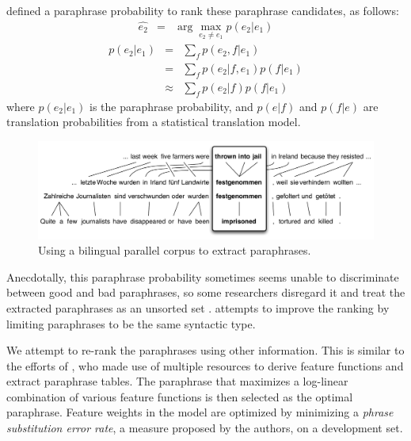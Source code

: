 \documentclass[11pt]{article}
\begin{document}
 defined a paraphrase probability to rank these paraphrase candidates,  as follows:
\begin{eqnarray} 
 \hat{e_2}	& = & \arg \max_{e_2 \neq e_1} p(e_2 | e_1)\label{paraphrase-prob}  
\end{eqnarray}
\begin{eqnarray} 
  p(e_2|e_1) &=& \sum_f p(e_2,f|e_1)\\
                  &=& \sum_f p(e_2|f,e_1) p(f|e_1) \\
                  &\approx& \sum_f p(e_2|f) p(f|e_1)
\label{paraphrase_prob_eqn}
\end{eqnarray}
where ${p(e_2|e_1)}$ is the paraphrase probability, and ${p(e|f)}$ and ${p(f|e)}$ are translation probabilities from a statistical translation model.  


\begin{figure}
\begin{center}
\includegraphics[width=\linewidth]{pivot-2}
\end{center}
\caption{\small Using a bilingual parallel corpus to extract paraphrases.}
\label{paraphrase-illustration}
\end{figure}

Anecdotally, this paraphrase probability sometimes seems unable to discriminate between good and bad paraphrases, so some researchers disregard it and treat the extracted paraphrases as an unsorted set \cite{Snover2010}.   attempts to improve the ranking by limiting paraphrases to be the same syntactic type.  

We attempt to re-rank the paraphrases using other information. This is similar to the efforts of , who made use of multiple resources %
to derive feature functions and extract paraphrase tables. The paraphrase that maximizes a log-linear combination of various feature functions is then selected as the optimal paraphrase. Feature weights in the model are optimized by minimizing a {\it phrase substitution error rate}, a measure proposed by the authors, on a development set.
\end{document}
